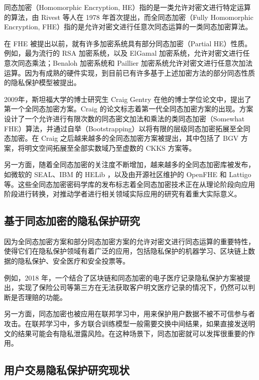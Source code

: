 同态加密（Homomorphic Encryption, HE）指的是一类允许对密文进行特定运算的算法，由 Rivest 等人在 1978 年首次提出\cite{rivest1978data}，而全同态加密（Fully Homomorphic Encryption, FHE）指的是允许对密文进行任意次同态运算的一类同态加密算法。

在 FHE 被提出以前，就有许多加密系统具有部分同态加密（Partial HE）性质。例如，最为流行的 RSA 加密系统，以及 ElGamal 加密系统，允许对密文进行任意次同态乘法\cite{rivest1978method,elgamal1985public}；Benaloh 加密系统和 Paillier 加密系统允许对密文进行任意次加法运算\cite{paillier1999public}。因为有成熟的硬件实现，到目前已有许多基于上述加密方法的部分同态性质的隐私保护模型被提出。

2009年，斯坦福大学的博士研究生 Craig Gentry 在他的博士学位论文中，提出了第一个全同态加密方案\cite{homenc}。Craig 的论文标志着第一代全同态加密方案的出现。方案设计了一个允许进行有限次数的同态密文加法和乘法的类同态加密（Somewhat FHE）算法，并通过自举（Bootstrapping）以将有限的层级同态加密拓展至全同态加密。在 Craig 之后越来越多的全同态加密方案被提出，其中包括了 BGV 方案，将明文空间拓展至全部实数域乃至虚数的 CKKS\cite{cryptoeprint:2016/421} 方案等。

另一方面，随着全同态加密的关注度不断增加，越来越多的全同态加密库被发布，如微软的 SEAL\cite{sealcrypto}、IBM 的 HELib  ，以及由开源社区维护的 OpenFHE\cite{OpenFHE} 和 Lattigo\cite{Mouchet2020LattigoAM} 等。这些全同态加密密码学库的发布标志着全同态加密技术正在从理论阶段向应用阶段进行转换\cite{ZQL-SEAL}，对推动学者进行相关领域实际应用的研究有着重大实际意义。

\subsection{基于同态加密的隐私保护研究}

因为全同态加密方案和部分同态加密方案的允许对密文进行同态运算的重要特性，使得它们在隐私保护领域有着广泛的应用，包括隐私保护的机器学习、区块链上数据的隐私保护、安全医疗和安全投票等。

例如，2018 年，一个结合了区块链和同态加密的电子医疗记录隐私保护方案被提出\cite{}，实现了保险公司等第三方在无法获取客户明文医疗记录的情况下，仍然可以判断是否理赔的功能。

另一方面，同态加密也被应用在联邦学习中，用来保护用户数据不被不可信参与者攻击。\cite{FL_HE}在联邦学习中，多方联合训练模型一般需要交换中间结果，如果直接发送明文的结果可能会有隐私泄露风险。在这种场景下，同态加密就可以发挥很重要的作用。

\subsection{用户交易隐私保护研究现状}

